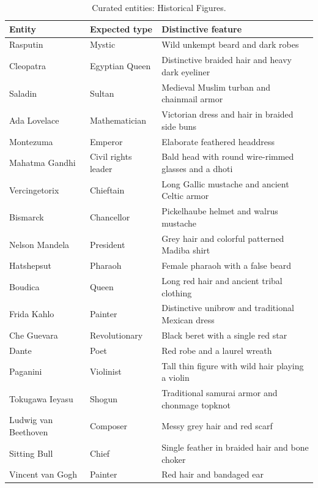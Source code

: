 \begin{table}[p]
\centering
\small
\caption{Curated entities: Historical Figures.}
\label{tab:curated-figures}
\begin{tabular}{@{}p{}p{}p{}@{}}
\toprule
Entity & Expected type & Distinctive feature\tabularnewline
\midrule
\raggedright Rasputin & \raggedright Mystic & \raggedright Wild unkempt beard and dark robes\tabularnewline
\raggedright Cleopatra & \raggedright Egyptian Queen & \raggedright Distinctive braided hair and heavy dark eyeliner\tabularnewline
\raggedright Saladin & \raggedright Sultan & \raggedright Medieval Muslim turban and chainmail armor\tabularnewline
\raggedright Ada Lovelace & \raggedright Mathematician & \raggedright Victorian dress and hair in braided side buns\tabularnewline
\raggedright Montezuma & \raggedright Emperor & \raggedright Elaborate feathered headdress\tabularnewline
\raggedright Mahatma Gandhi & \raggedright Civil rights leader & \raggedright Bald head with round wire-rimmed glasses and a dhoti\tabularnewline
\raggedright Vercingetorix & \raggedright Chieftain & \raggedright Long Gallic mustache and ancient Celtic armor\tabularnewline
\raggedright Bismarck & \raggedright Chancellor & \raggedright Pickelhaube helmet and walrus mustache\tabularnewline
\raggedright Nelson Mandela & \raggedright President & \raggedright Grey hair and colorful patterned Madiba shirt\tabularnewline
\raggedright Hatshepsut & \raggedright Pharaoh & \raggedright Female pharaoh with a false beard\tabularnewline
\raggedright Boudica & \raggedright Queen & \raggedright Long red hair and ancient tribal clothing\tabularnewline
\raggedright Frida Kahlo & \raggedright Painter & \raggedright Distinctive unibrow and traditional Mexican dress\tabularnewline
\raggedright Che Guevara & \raggedright Revolutionary & \raggedright Black beret with a single red star\tabularnewline
\raggedright Dante & \raggedright Poet & \raggedright Red robe and a laurel wreath\tabularnewline
\raggedright Paganini & \raggedright Violinist & \raggedright Tall thin figure with wild hair playing a violin\tabularnewline
\raggedright Tokugawa Ieyasu & \raggedright Shogun & \raggedright Traditional samurai armor and chonmage topknot\tabularnewline
\raggedright Ludwig van Beethoven & \raggedright Composer & \raggedright Messy grey hair and red scarf\tabularnewline
\raggedright Sitting Bull & \raggedright Chief & \raggedright Single feather in braided hair and bone choker\tabularnewline
\raggedright Vincent van Gogh & \raggedright Painter & \raggedright Red hair and bandaged ear\tabularnewline

\end{tabular}
\end{table}
